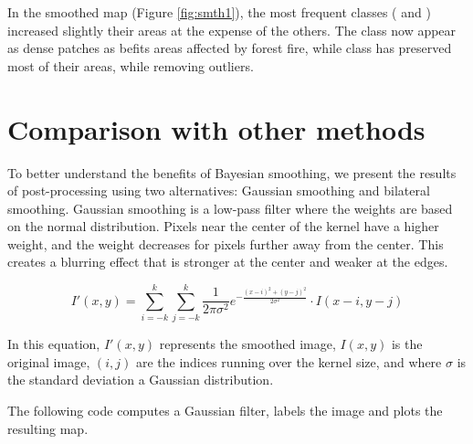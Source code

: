 \documentclass[
  shortnames]{jss}
\begin{document}
\FloatBarrier

In the smoothed map (Figure \ref{fig:smth1}), the most frequent classes ( and ) increased slightly their areas at the expense of the others. The class  now appear as dense patches as befits areas affected by forest fire, while class  has preserved most of their areas, while removing outliers.

\newpage

\section{Comparison with other methods}\label{comparison-with-other-methods}

To better understand the benefits of Bayesian smoothing, we present the results of post-processing using two alternatives: Gaussian smoothing and bilateral smoothing. Gaussian smoothing is a low-pass filter where the weights are based on the normal distribution. Pixels near the center of the kernel have a higher weight, and the weight decreases for pixels further away from the center. This creates a blurring effect that is stronger at the center and weaker at the edges.

\begin{equation}
   I'(x, y) = \sum_{i=-k}^{k} \sum_{j=-k}^{k} \frac{1}{2\pi\sigma^2} e^{-\frac{(x-i)^2 + (y-j)^2}{2\sigma^2}} \cdot I(x - i, y - j)
\end{equation}

In this equation, \(I'(x, y)\) represents the smoothed image, \(I(x, y)\) is the original image, \((i,j)\) are the indices running over the kernel size, and where \(\sigma\) is the standard deviation a Gaussian distribution.

The following code computes a Gaussian filter, labels the image and plots the resulting map.
\end{document}
